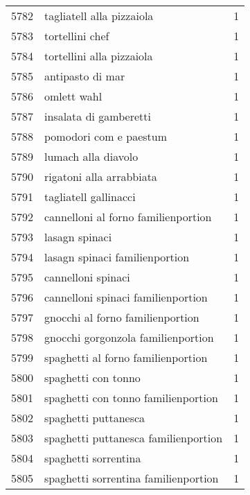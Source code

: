 \begin{tabular}{llr}
5782 &                          tagliatell alla pizzaiola &      1 \\
5783 &                                    tortellini chef &      1 \\
5784 &                          tortellini alla pizzaiola &      1 \\
5785 &                                   antipasto di mar &      1 \\
5786 &                                        omlett wahl &      1 \\
5787 &                             insalata di gamberetti &      1 \\
5788 &                             pomodori com e paestum &      1 \\
5789 &                                lumach alla diavolo &      1 \\
5790 &                           rigatoni alla arrabbiata &      1 \\
5791 &                              tagliatell gallinacci &      1 \\
5792 &                cannelloni al forno familienportion &      1 \\
5793 &                                     lasagn spinaci &      1 \\
5794 &                     lasagn spinaci familienportion &      1 \\
5795 &                                 cannelloni spinaci &      1 \\
5796 &                 cannelloni spinaci familienportion &      1 \\
5797 &                   gnocchi al forno familienportion &      1 \\
5798 &                 gnocchi gorgonzola familienportion &      1 \\
5799 &                 spaghetti al forno familienportion &      1 \\
5800 &                                spaghetti con tonno &      1 \\
5801 &                spaghetti con tonno familienportion &      1 \\
5802 &                               spaghetti puttanesca &      1 \\
5803 &               spaghetti puttanesca familienportion &      1 \\
5804 &                               spaghetti sorrentina &      1 \\
5805 &               spaghetti sorrentina familienportion &      1 \\

\end{tabular}
